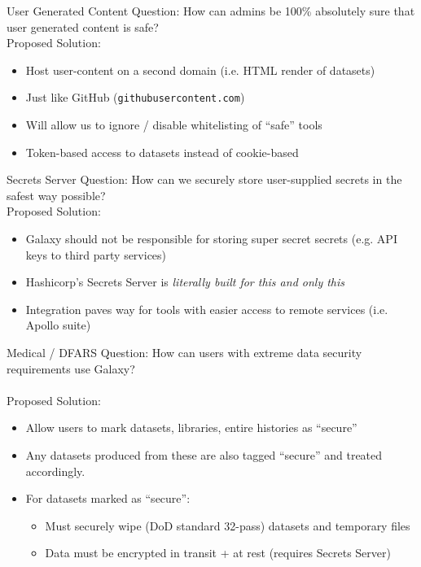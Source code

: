 \documentclass[12pt]{ufrslides}
\begin{document}
	\begin{frame}{User Generated Content}
		Question: How can admins be 100\% absolutely sure that user generated content is safe? \\[0.6cm]
		Proposed Solution:
		\begin{itemize}
			\item Host user-content on a second domain (i.e. HTML render of datasets)
			\item Just like GitHub (\texttt{githubusercontent.com})
			\item Will allow us to ignore / disable whitelisting of ``safe'' tools
			\item Token-based access to datasets instead of cookie-based
		\end{itemize}
	\end{frame}

	\begin{frame}{Secrets Server}
		Question: How can we securely store user-supplied secrets in the safest way possible? \\[0.6cm]
		Proposed Solution:
		\begin{itemize}
			\item Galaxy should not be responsible for storing super secret secrets (e.g. API keys to third party services)
			\item Hashicorp's Secrets Server is \emph{literally built for this and only this}
			\item Integration paves way for tools with easier access to remote services (i.e. Apollo suite)
		\end{itemize}
	\end{frame}

	\begin{frame}{Medical / DFARS}
		Question: How can users with extreme data security requirements use Galaxy?\\ \ \\
		Proposed Solution:
		\begin{itemize}
			\item Allow users to mark datasets, libraries, entire histories as ``secure''
			\item Any datasets produced from these are also tagged ``secure'' and treated accordingly.
			\item For datasets marked as ``secure'':
				\begin{itemize}
					\item Must securely wipe (DoD standard 32-pass) datasets and temporary files
					\item Data must be encrypted in transit + at rest (requires Secrets Server)
				\end{itemize}
		\end{itemize}
	\end{frame}
\end{document}
